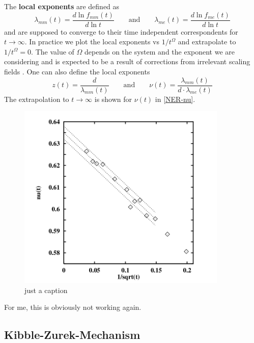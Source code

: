 	The \textbf{local exponents} are defined as
	\begin{equation}
		\lambda_{mm}(t) =	\frac{d\ln f_{mm} (t)}{d\ln t} \qquad \text{and} \qquad \lambda_{me}(t) =	\frac{d\ln f_{me} (t)}{d\ln t}
	\end{equation}
	and are supposed to converge to their time independent correspondents for $t \rightarrow \infty$. In practice we plot the local exponents vs $1/t^\Omega$ and extrapolate to $ 1 /	t^\Omega =	0$. The value of $\Omega$ depends on the system and the exponent we are considering and is expected to be a result of corrections from irrelevant scaling fields \cite{yao2001appc}.
	One can also define the local exponents
	\begin{equation}
		z(t) = \frac{d}{\lambda_{mm} (t)} \qquad \text{and} \qquad \nu(t) =	\frac{\lambda_{mm}(t)}{d \cdot \lambda_{me}(t)}
	\end{equation}
	The extrapolation to $t \rightarrow \infty$ is shown for $\nu (t)$ in \autoref{NER-nu}.
	
	\begin{figure}[htp]
		\centering
		\includegraphics[width=10cm]{graphics/NER-nu.png}
		\caption{just a caption}
		\label{NER-nu}
	\end{figure}
	For me, this is obviously not working again.
	\subsection{Kibble-Zurek-Mechanism}
	\label{KZM}
